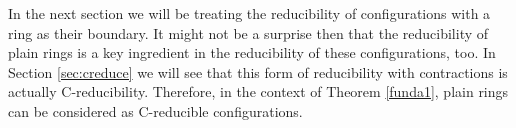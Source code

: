 In the next section we will be treating the reducibility of configurations with a ring as their boundary. It might not be a surprise then that the reducibility of plain rings is a key ingredient in the reducibility of these configurations, too. In Section \ref{sec:creduce} we will see that this form of reducibility with contractions is actually C-reducibility. Therefore, in the context of Theorem \ref{funda1}, plain rings can be considered as C-reducible configurations. 